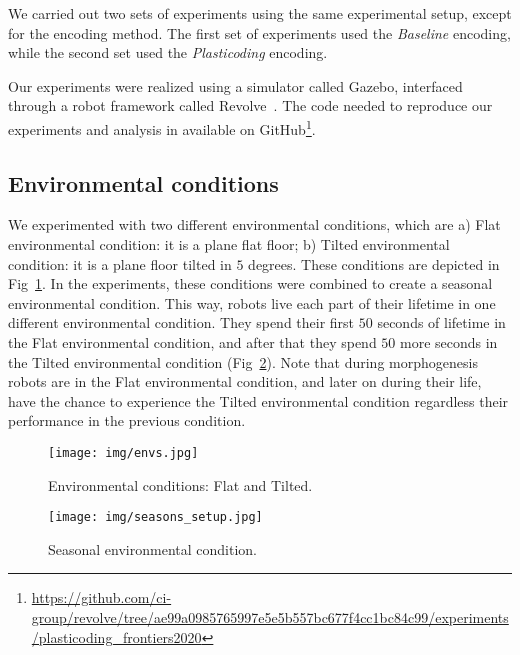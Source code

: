\documentclass[utf8]{frontiersSCNS} %
\begin{document}
 
 We carried out two sets of experiments using the same experimental setup, except for the encoding method. The first set of experiments used the \textit{Baseline} encoding, while the second set used the \textit{Plasticoding} encoding.
 
Our experiments were realized using a simulator called Gazebo, interfaced through a robot framework called Revolve~\citep{hupkes2018revolve}.
The code needed to reproduce our experiments and analysis in available on GitHub\footnote{\url{https://github.com/ci-group/revolve/tree/ae99a0985765997e5e5b557bc677f4cc1bc84c99/experiments/plasticoding_frontiers2020}}.%

\subsection{Environmental conditions}

We experimented with two different environmental conditions, which are a) Flat environmental condition: it is a plane flat floor; b) Tilted environmental condition: it is a plane floor tilted in $5$ degrees. These conditions are depicted in Fig~\ref{fig:environments}. In the experiments, these conditions were combined to create a seasonal environmental condition. This way, robots live each part of their lifetime in one different environmental condition. They spend their first $50$ seconds of lifetime in the Flat environmental condition, and after that they spend $50$ more seconds in the Tilted environmental condition (Fig~\ref{fig:seasons_setup}). Note that during morphogenesis robots are in the Flat environmental condition, and later on during their life, have the chance to experience the Tilted environmental condition regardless their performance in the previous condition. 
    
     \begin{figure}[t]
    \begin{center}
         \texttt{[image: img/envs.jpg]}
    \caption{Environmental conditions: Flat and Tilted.}
        \label{fig:environments}
    \end{center}
    \end{figure}
    
         \begin{figure}[t]
    \begin{center}
         \texttt{[image: img/seasons\_setup.jpg]}
    \caption{Seasonal environmental condition.}
        \label{fig:seasons_setup}
    \end{center}
    \end{figure}
    
\end{document}
